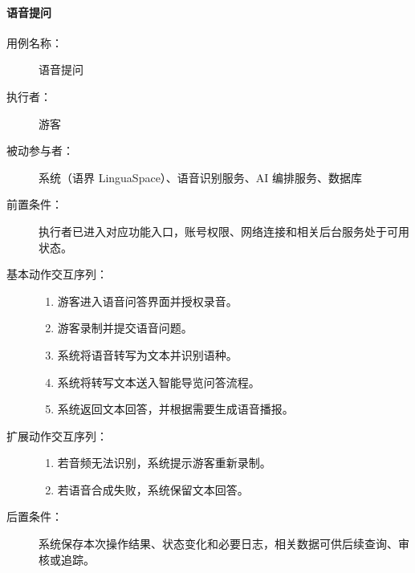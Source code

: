 \paragraph{语音提问}
\begin{description}
  \item[用例名称：] 语音提问
  \item[执行者：] 游客
  \item[被动参与者：] 系统（语界 LinguaSpace）、语音识别服务、AI 编排服务、数据库
  \item[前置条件：] 执行者已进入对应功能入口，账号权限、网络连接和相关后台服务处于可用状态。
  \item[基本动作交互序列：]
  \begin{enumerate}
    \item 游客进入语音问答界面并授权录音。
    \item 游客录制并提交语音问题。
    \item 系统将语音转写为文本并识别语种。
    \item 系统将转写文本送入智能导览问答流程。
    \item 系统返回文本回答，并根据需要生成语音播报。
  \end{enumerate}
  \item[扩展动作交互序列：]
  \begin{enumerate}
    \item[3a.] 若音频无法识别，系统提示游客重新录制。
    \item[5a.] 若语音合成失败，系统保留文本回答。
  \end{enumerate}
  \item[后置条件：] 系统保存本次操作结果、状态变化和必要日志，相关数据可供后续查询、审核或追踪。
\end{description}

